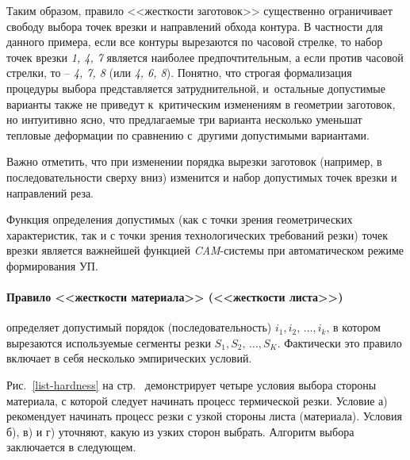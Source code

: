 Таким образом, правило <<жесткости заготовок>>
существенно ограничивает свободу выбора точек
врезки и направлений обхода контура.
В частности для данного примера,
если все контуры вырезаются по часовой стрелке,
то набор точек врезки {\it 1, 4, 7}
является наиболее предпочтительным,
а если против часовой стрелки, то -- {\it 4, 7, 8}
(или {\it 4, 6, 8}).
Понятно, что строгая формализация процедуры
выбора представляется затруднительной,
и~остальные допустимые варианты также не приведут
к~критическим изменениям в геометрии заготовок,
но интуитивно ясно, что предлагаемые три варианта
несколько уменьшат тепловые деформации по сравнению
с~другими допустимыми вариантами.

Важно отметить,
что при изменении порядка вырезки заготовок
(например, в последовательности сверху вниз)
изменится и набор допустимых точек врезки и направлений реза.

Функция определения допустимых
(как с точки зрения геометрических характеристик,
так и с точки зрения технологических требований резки)
точек врезки является важнейшей функцией
{\it CAM}-системы
при автоматическом режиме формирования УП.

\paragraph*{Правило <<жесткости материала>> (<<жесткости листа>>)}

определяет допустимый порядок
(последовательность)
$i_1, i_2, \,\dots, i_k$,
в котором вырезаются используемые сегменты резки
$S_1, S_2, \,\dots, S_K$.
Фактически это правило включает в себя несколько
эмпирических условий.

Рис.~\ref{list-hardness}
на стр.~\pageref{list-hardness}
демонстрирует четыре условия выбора стороны материала,
с которой следует начинать процесс термической резки.
Условие а) рекомендует начинать процесс резки с узкой стороны листа (материала).
Условия б), в) и г) уточняют,
какую из узких сторон выбрать.
Алгоритм выбора заключается в следующем.

